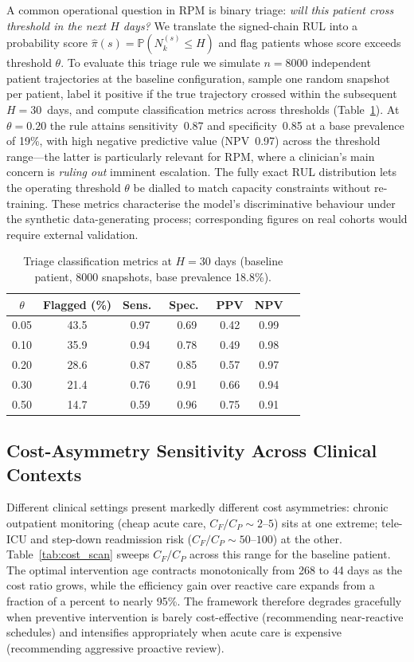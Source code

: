 \documentclass[pdflatex,sn-mathphys-num]{sn-jnl}
\theoremstyle{definition}
\newcommand{\Prob}{\mathbb{P}}
\numberwithin{equation}{section}
\begin{document}
A common operational question in RPM is binary triage: \emph{will this patient cross threshold in the next $H$ days?} We translate the signed-chain RUL into a probability score $\hat\pi(s)=\Prob(N_k^{(s)}\le H)$ and flag patients whose score exceeds threshold $\theta$. To evaluate this triage rule we simulate $n=8000$ independent patient trajectories at the baseline configuration, sample one random snapshot per patient, label it positive if the true trajectory crossed within the subsequent $H=30$~days, and compute classification metrics across thresholds (Table~\ref{tab:triage}). At $\theta=0.20$ the rule attains sensitivity~0.87 and specificity~0.85 at a base prevalence of 19\%, with high negative predictive value (NPV~0.97) across the threshold range---the latter is particularly relevant for RPM, where a clinician's main concern is \emph{ruling out} imminent escalation. The fully exact RUL distribution lets the operating threshold $\theta$ be dialled to match capacity constraints without re-training. These metrics characterise the model's discriminative behaviour under the synthetic data-generating process; corresponding figures on real cohorts would require external validation.

\begin{table}[htbp]
\centering
\caption{Triage classification metrics at $H=30$ days (baseline patient, 8000 snapshots, base prevalence 18.8\%).}
\label{tab:triage}
\small
\begin{tabular}{ccccccc}
\toprule
$\theta$ & Flagged (\%) & Sens.\ & Spec.\ & PPV & NPV \\
\midrule
0.05 & 43.5 & 0.97 & 0.69 & 0.42 & 0.99 \\
0.10 & 35.9 & 0.94 & 0.78 & 0.49 & 0.98 \\
0.20 & 28.6 & 0.87 & 0.85 & 0.57 & 0.97 \\
0.30 & 21.4 & 0.76 & 0.91 & 0.66 & 0.94 \\
0.50 & 14.7 & 0.59 & 0.96 & 0.75 & 0.91 \\
\bottomrule
\end{tabular}
\end{table}

\subsection{Cost-Asymmetry Sensitivity Across Clinical Contexts}\label{sec:case_cost}

Different clinical settings present markedly different cost asymmetries: chronic outpatient monitoring (cheap acute care, $C_F/C_P\!\sim\!2$--$5$) sits at one extreme; tele-ICU and step-down readmission risk ($C_F/C_P\!\sim\!50$--$100$) at the other. Table~\ref{tab:cost_scan} sweeps $C_F/C_P$ across this range for the baseline patient. The optimal intervention age contracts monotonically from 268 to 44 days as the cost ratio grows, while the efficiency gain over reactive care expands from a fraction of a percent to nearly 95\%. The framework therefore degrades gracefully when preventive intervention is barely cost-effective (recommending near-reactive schedules) and intensifies appropriately when acute care is expensive (recommending aggressive proactive review).
\end{document}
